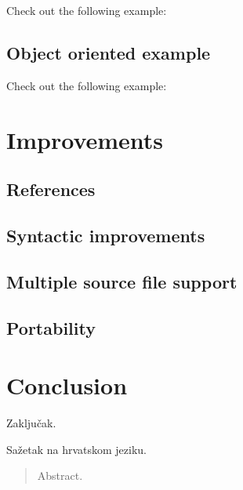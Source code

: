 \documentclass[times, utf8, diplomski]{fer}
\theoremstyle{definition}
\begin{document}
Check out the following example:


\section{Object oriented example}

Check out the following example:



\chapter{Improvements}

\section{References}

\section{Syntactic improvements}

\section{Multiple source file support}

\section{Portability}





\chapter{Conclusion}
Zaključak.




\begin{sazetak}
Sažetak na hrvatskom jeziku.

\end{sazetak}

\begin{abstract}
Abstract.

\end{abstract}
\end{document}

